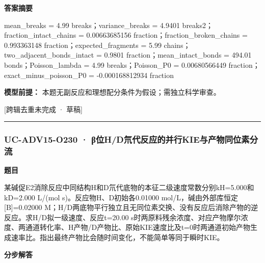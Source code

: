 \documentclass[UTF8,11pt,a4paper]{ctexart}
\begin{document}
\noindent\textbf{答案摘要}\par
mean\_breaks = 4.99 breaks；variance\_breaks = 4.9401 breaks2；fraction\_intact\_chains = 0.00663685156 fraction；fraction\_broken\_chains = 0.993363148 fraction；expected\_fragments = 5.99 chains；two\_adjacent\_bonds\_intact = 0.9801 fraction；mean\_intact\_bonds = 494.01 bonds；Poisson\_lambda = 4.99 breaks；Poisson\_P0 = 0.00680566449 fraction；exact\_minus\_poisson\_P0 = -0.000168812934 fraction\par
\noindent\textbf{模型前提：}
本题无副反应和理想配分条件为假设；需独立科学审查。\par
\noindent\textcolor{red!65!black}{[跨辑去重未完成 · 草稿]} \par
\medskip\hrule\medskip
{}
\subsubsection*{UC-ADV15-O230 · β位H/D氘代反应的并行KIE与产物同位素分流}
\noindent\textbf{题目}\par
某碱促E2消除反应中同结构H和D氘代底物的本征二级速度常数分别kH=5.000和kD=2.000 L/(mol s)。反应物H、D初始各0.01000 mol/L，碱由外部库恒定[B]=0.02000 M；H/D两底物平行独立且无同位素交换、没有反应后消除产物的逆反应。求H/D拟一级速度、反应t=20.00 s时两原料残余浓度、对应产物摩尔浓度、两通道转化率、H产物/D产物比、原始KIE速度比及t=0时两通道初始产物生成速率比。指出最终产物比会随时间变化，不能简单等同于瞬时KIE。\par
\medskip\noindent\textbf{分步解答}
\end{document}
